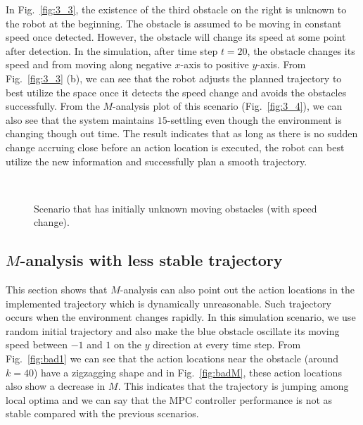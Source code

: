 \documentclass[letterpaper, 10 pt, conference]{ieeeconf}  %
\begin{document}
In Fig.~\ref{fig:3_3}, the existence of the third obstacle on the right is unknown to the robot at the beginning. The obstacle is assumed to be moving in constant speed once detected. However, the obstacle will change its speed at some point after detection. In the simulation, after time step $t=20$, the obstacle changes its speed and from moving along negative $x$-axis to positive $y$-axis. From Fig.~\ref{fig:3_3} (b), we can see that the robot adjusts the planned trajectory to best utilize the space once it detects the speed change and avoids the obstacles successfully. From the $M$-analysis plot of this scenario (Fig.~\ref{fig:3_4}), we can also see that the system maintains $15$-settling even though the environment is changing though out time. The result indicates that as long as there is no sudden change accruing close before an action location is executed, the robot can best utilize the new information and successfully plan a smooth trajectory.



\begin{figure}[t]
      \centering
      \\
      
      \caption{Scenario that has initially unknown moving obstacles (with speed change).}
      
\end{figure}



\subsection{$M$-analysis with less stable trajectory}

This section shows that $M$-analysis can also point out the action locations in the implemented trajectory which is dynamically unreasonable. Such trajectory occurs when the environment changes rapidly. In this simulation scenario, we use random initial trajectory and also make the blue obstacle oscillate its moving speed between $-1$ and $1$ on the $y$ direction at every time step. From Fig.~\ref{fig:bad1} we can see that the action locations near the obstacle (around $k=40$) have a zigzagging shape and in Fig.~\ref{fig:badM}, these action locations also show a decrease in $M$. This indicates that the trajectory is jumping among local optima and we can say that the MPC controller performance is not as stable compared with the previous scenarios.
\end{document}
